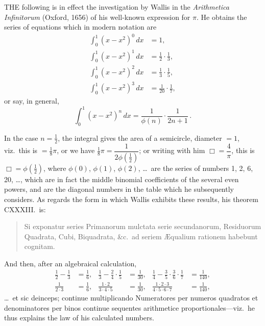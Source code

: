 \documentclass[11pt,a4paper]{article}
\begin{document}
THE following is in effect the investigation by Wallis in the \emph{Arithmetica Infinitorum} (Oxford, 1656) of his well-known expression for $\pi$. He obtains the series of equations which in modern notation are
\begin{align*}
\int_0^1 (x - x^2)^0\,dx &= 1,\\
\int_0^1 (x - x^2)^1\,dx &= \tfrac{1}{2}\cdot\tfrac{1}{3},\\
\int_0^1 (x - x^2)^2\,dx &= \tfrac{1}{3}\cdot\tfrac{1}{5},\\
\int_0^1 (x - x^2)^3\,dx &= \tfrac{1}{20}\cdot\tfrac{1}{7},
\end{align*}
or say, in general,
\[
\int_0^1 (x - x^2)^n\,dx = \frac{1}{\phi(n)}\cdot\frac{1}{2n+1}\,.
\]

In the case $n = \tfrac{1}{2}$, the integral gives the area of a semicircle, diameter $= 1$, viz.\ this is $= \tfrac{1}{8}\pi$, or we have $\tfrac{1}{8}\pi = \dfrac{1}{2\phi(\tfrac{1}{2})}$; or writing with him $\Box = \dfrac{4}{\pi}$, this is $\Box = \phi(\tfrac{1}{2})$, where $\phi(0)$, $\phi(1)$, $\phi(2)$, \ldots\ are the series of numbers 1, 2, 6, 20, \ldots, which are in fact the middle binomial coefficients of the several even powers, and are the diagonal numbers in the table which he subsequently considers. As regards the form in which Wallis exhibits these results, his theorem CXXXIII.\ is:

\begin{quote}
Si exponatur series Primanorum mulctata serie secundanorum, Residuorum Quadrata, Cubi, Biquadrata, \&c.\ ad seriem \AE qualium rationem habebunt cognitam.
\end{quote}

And then, after an algebraical calculation,
\begin{align*}
\tfrac{1}{2} - \tfrac{1}{3} &= \tfrac{1}{6}, & \tfrac{1}{3} - \tfrac{2}{4} \cdot \tfrac{1}{5} &= \tfrac{1}{30}, & \tfrac{1}{4} - \tfrac{3}{5} \cdot \tfrac{3}{6} \cdot \tfrac{1}{7} &= \tfrac{1}{140},\\
\tfrac{1}{2 \cdot 3} &= \tfrac{1}{6}, & \tfrac{1 \cdot 2}{3 \cdot 4 \cdot 5} &= \tfrac{1}{30}, & \tfrac{1 \cdot 2 \cdot 3}{4 \cdot 5 \cdot 6 \cdot 7} &= \tfrac{1}{140},
\end{align*}
\ldots\ et sic deinceps; continue multiplicando Numeratores per numeros quadratos et denominatores per binos continue sequentes arithmetice proportionales---viz.\ he thus explains the law of his calculated numbers.
\end{document}
